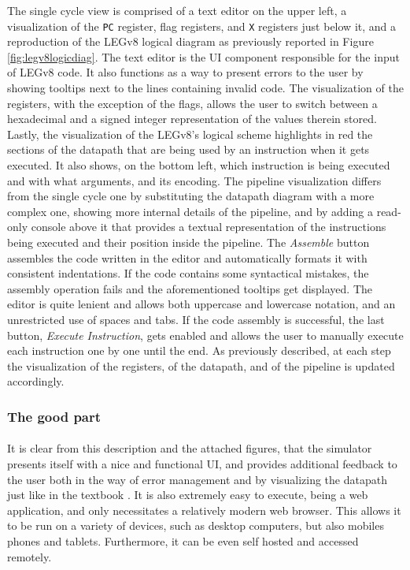 The single cycle view is comprised of a text editor on the upper left, a visualization of the \verb|PC| register, flag registers, and \verb|X| registers just below it, and a reproduction of the LEGv8 logical diagram as previously reported in Figure \ref{fig:legv8logicdiag}. The text editor is the UI component responsible for the input of LEGv8 code. It also functions as a way to present errors to the user by showing tooltips next to the lines containing invalid code. The visualization of the registers, with the exception of the flags, allows the user to switch between a hexadecimal and a signed integer representation of the values therein stored. Lastly, the visualization of the LEGv8's logical scheme highlights in red the sections of the datapath that are being used by an instruction when it gets executed. It also shows, on the bottom left, which instruction is being executed and with what arguments, and its encoding.
The pipeline visualization differs from the single cycle one by substituting the datapath diagram with a more complex one, showing more internal details of the pipeline, and by adding a read-only console above it that provides a textual representation of the instructions being executed and their position inside the pipeline.
The \emph{Assemble} button assembles the code written in the editor and automatically formats it with consistent indentations. If the code contains some syntactical mistakes, the assembly operation fails and the aforementioned tooltips get displayed. The editor is quite lenient and allows both uppercase and lowercase notation, and an unrestricted use of spaces and tabs.
If the code assembly is successful, the last button, \emph{Execute Instruction}, gets enabled and allows the user to manually execute each instruction one by one until the end. As previously described, at each step the visualization of the registers, of the datapath, and of the pipeline is updated accordingly.
\subsubsection{The good part}
\paragraph{}
It is clear from this description and the attached figures, that the simulator presents itself with a nice and functional UI, and provides additional feedback to the user both in the way of error management and by visualizing the datapath just like in the textbook \cite{patterson2016computer}. It is also extremely easy to execute, being a web application, and only necessitates a relatively modern web browser. This allows it to be run on a variety of devices, such as desktop computers, but also mobiles phones and tablets. Furthermore, it can be even self hosted and accessed remotely.

